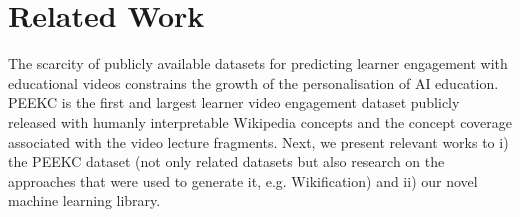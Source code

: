 \documentclass[letterpaper]{article} %
\begin{document}



\section{Related Work}

The scarcity of publicly available datasets
for predicting learner engagement with educational videos constrains the growth of the personalisation of AI education. PEEKC is the first and largest learner video engagement dataset publicly released with humanly interpretable Wikipedia concepts and the concept coverage associated with the video lecture fragments.
Next, we present relevant works to i) the PEEKC dataset (not only related datasets but also research on the approaches that were used to generate it, e.g. Wikification) and ii) our novel machine learning library.
\end{document}

